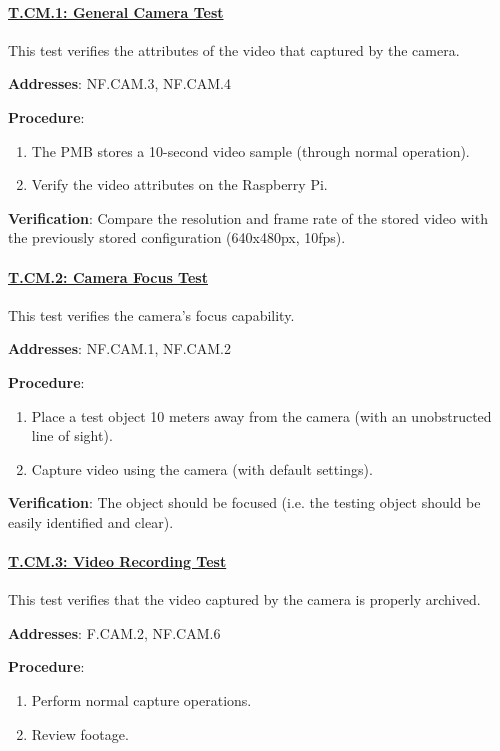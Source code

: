 \paragraph{\underline{T.CM.1: General Camera Test}}

This test verifies the attributes of the video that captured by the camera.

\textbf{Addresses}: NF.CAM.3, NF.CAM.4

\textbf{Procedure}:
\begin{enumerate}[noitemsep]
    \item The PMB stores a 10-second video sample (through normal operation).
    \item Verify the video attributes on the Raspberry Pi.
\end{enumerate}

\textbf{Verification}: 
Compare the resolution and frame rate of the stored video with the previously stored configuration (640x480px, 10fps).

%

\paragraph{\underline{T.CM.2: Camera Focus Test}}

This test verifies the camera's focus capability.

\textbf{Addresses}: NF.CAM.1, NF.CAM.2

\textbf{Procedure}:
\begin{enumerate}[noitemsep]
    \item Place a test object 10 meters away from the camera (with an unobstructed line of sight).
    \item Capture video using the camera (with default settings).
\end{enumerate}

\textbf{Verification}: 
The object should be focused (i.e. the testing object should be easily identified and clear).

%

\paragraph{\underline{T.CM.3: Video Recording Test}}

This test verifies that the video captured by the camera is properly archived.

\textbf{Addresses}: F.CAM.2, NF.CAM.6

\textbf{Procedure}:
\begin{enumerate}[noitemsep]
    \item Perform normal capture operations.
    \item Review footage.
\end{enumerate}

